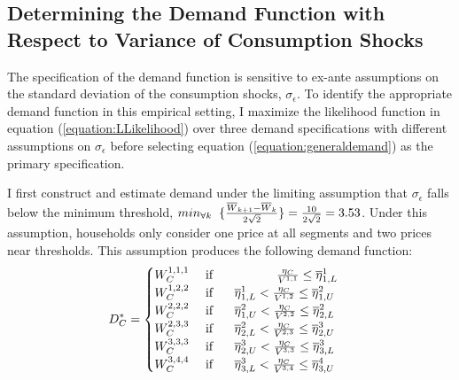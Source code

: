 \documentclass[12pt]{article}
\begin{document}
\begin{appendices}
\section{Determining the Demand Function with Respect to Variance of Consumption Shocks}\label{appendix:sigmanuassumptions}

The specification of the demand function is sensitive to ex-ante assumptions on the standard deviation of the consumption shocks, $\sigma_{\epsilon}$.  To identify the appropriate demand function in this empirical setting, I maximize the likelihood function in equation (\ref{equation:LLikelihood}) over three demand specifications with different assumptions on $\sigma_{\epsilon}$ before selecting equation (\ref{equation:generaldemand}) as the primary specification.  

I first construct and estimate demand under the limiting assumption that $\sigma_{\epsilon}$ falls below the minimum threshold, $min_{\forall k}\hspace{.2cm} \{ \frac{\overline{W}_{k+1} - \overline{W}_k}{2\sqrt{2}} \} = \frac{10}{2\sqrt{2}} = 3.53$.  Under this assumption, households only consider one price at all segments and two prices near thresholds.  This assumption produces the following demand function:
\begin{align}\label{equation:demandalt1}
\begin{split}
D^{*}_C &=
\begin{cases}
W^{1,1,1}_C   & \text{ if } \hspace{1.7cm}   \frac{ \eta_C }{ V^{1,1} }  \leq \overline{\eta}^{1}_{1,L}  \\
W^{1,2,2}_C   & \text{ if } \hspace{.5cm} \overline{\eta}^{1}_{1,L} <    \frac{ \eta_C }{ V^{1,2} }    \leq \overline{\eta}^{2}_{1,U}  \\
W^{2,2,2}_C   & \text{ if } \hspace{.5cm} \overline{\eta}^{2}_{1,U} <    \frac{ \eta_C }{ V^{2,2} }    \leq \overline{\eta}^{2}_{2,L}  \\
W^{2,3,3}_C   & \text{ if } \hspace{.5cm} \overline{\eta}^{2}_{2,L} <    \frac{ \eta_C }{ V^{2,3} }    \leq \overline{\eta}^{3}_{2,U}  \\ 
W^{3,3,3}_C   & \text{ if } \hspace{.5cm} \overline{\eta}^{3}_{2,U} <    \frac{ \eta_C }{ V^{3,3} }    \leq \overline{\eta}^{3}_{3,L}  \\ 
W^{3,4,4}_C   & \text{ if } \hspace{.5cm} \overline{\eta}^{3}_{3,L} <    \frac{ \eta_C }{ V^{3,4} }    \leq \overline{\eta}^{4}_{3,U}  \\ 

\end{cases}
\end{split}
\end{align}
\end{appendices}
\end{document}
